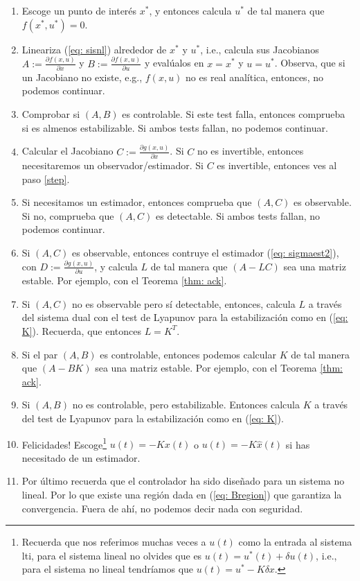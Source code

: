 \begin{enumerate}
	\item Escoge un punto de interés $x^*$, y entonces calcula $u^*$ de tal manera que  $f(x^*,u^*) = 0$.
	\item Lineariza (\ref{eq: sisnl}) alrededor de  $x^*$ y $u^*$, i.e., calcula sus Jacobianos $A:=\frac{\partial f(x,u)}{\partial x}$ y $B:=\frac{\partial f(x,u)}{\partial u}$ y evalúalos en $x=x^*$ y $u=u^*$. Observa, que si un Jacobiano no existe, e.g., $f(x,u)$ no es real analítica, entonces, no podemos continuar.
	\item Comprobar si $(A,B)$ es controlable. Si este test falla, entonces comprueba si es almenos estabilizable. Si ambos tests fallan, no podemos continuar.
	\item Calcular el Jacobiano $C:=\frac{\partial g(x,u)}{\partial x}$. Si $C$ no es invertible, entonces necesitaremos un observador/estimador. Si $C$ es invertible, entonces ves al paso \ref{step}.
	\item Si necesitamos un estimador, entonces comprueba que $(A,C)$ es observable. Si no, comprueba que $(A,C)$ es detectable. Si ambos tests fallan, no podemos continuar.
	\item Si $(A,C)$ es observable, entonces contruye el estimador (\ref{eq: sigmaest2}), con $D:=\frac{\partial g(x,u)}{\partial u}$, y calcula $L$ de tal manera que $(A-LC)$ sea una matriz estable. Por ejemplo, con el Teorema \ref{thm: ack}.
	\item Si $(A,C)$ no es observable pero sí detectable, entonces, calcula $L$ a través del sistema dual con el test de Lyapunov para la estabilización como en (\ref{eq: K}). Recuerda, que entonces $L = K^T$.
	\item \label{step} Si el par $(A,B)$ es controlable, entonces podemos calcular $K$ de tal manera que $(A-BK)$ sea una matriz estable. Por ejemplo, con el Teorema \ref{thm: ack}.
	\item Si $(A,B)$ no es controlable, pero estabilizable. Entonces calcula $K$ a través del test de Lyapunov para la estabilización como en (\ref{eq: K}).
	\item Felicidades! Escoge\footnote{Recuerda que nos referimos muchas veces a $u(t)$ como la entrada al sistema lti, para el sistema lineal no olvides que es $u(t) = u^*(t) + \delta u(t)$, i.e., para el sistema no lineal tendríamos que $u(t) = u^* -K\delta x$.}  $u(t) = -Kx(t)$ o $u(t) = -K\hat x(t)$ si has necesitado de un estimador.
	\item Por último recuerda que el controlador ha sido diseñado para un sistema no lineal. Por lo que existe una región dada en (\ref{eq: Bregion}) que garantiza la convergencia. Fuera de ahí, no podemos decir nada con seguridad.
\end{enumerate}


